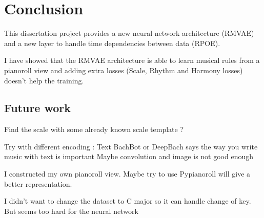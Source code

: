 \documentclass[12pt]{report}
\begin{document}

\chapter{Conclusion}

This dissertation project provides a new neural network architecture (RMVAE) and a new layer to handle time dependencies between data (RPOE).

I have showed that the RMVAE architecture is able to learn musical rules from a pianoroll view and adding extra losses (Scale, Rhythm and Harmony losses) doesn't help the training.


\section*{Future work}
Find the scale with some already known scale template ?

Try with different encoding : Text
BachBot or DeepBach says the way you write music with text is important 
Maybe convolution and image is not good enough

I constructed my own pianoroll view.
Maybe try to use Pypianoroll will give a better representation.


I didn't want to change the dataset to C major so it can handle change of key. But seems too hard for the neural network
\newpage




\end{document}
